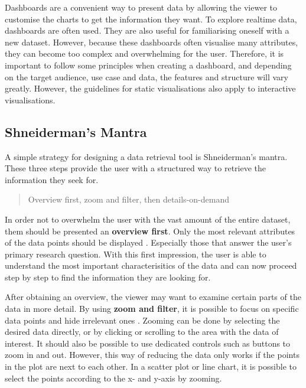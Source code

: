 \documentclass[11pt]{article}
\begin{document}
Dashboards are a convenient way to present data by allowing the viewer to customise the charts to get the information they want. To explore realtime data, dashboards are often used. They are also useful for familiarising oneself with a new dataset. However, because these dashboards often visualise many attributes, they can become too complex and overwhelming for the user. Therefore, it is important to follow some principles when creating a dashboard, and depending on the target audience, use case and data, the features and structure will vary greatly. However, the guidelines for static visualisations also apply to interactive visualisations.

\subsection{Shneiderman's Mantra}

A simple strategy for designing a data retrieval tool is Shneiderman's mantra. These three steps provide the user with a structured way to retrieve the information they seek for.

\begin{quote}
    Overview first, zoom and filter, then details-on-demand \parencite{shneiderman_thousand-fold_1997}
\end{quote}

In order not to overwhelm the user with the vast amount of the entire dataset, them should be presented an \textbf{overview first}. Only the most relevant attributes of the data points should be displayed \parencite{shneiderman_eyes_1996}. Especially those that answer the user's primary research question. With this first impression, the user is able to understand the most important characterisitics of the data and can now proceed step by step to find the information they are looking for.

After obtaining an overview, the viewer may want to examine certain parts of the data in more detail. By using \textbf{zoom and filter}, it is possible to focus on specific data points and hide irrelevant ones \parencite{shneiderman_eyes_1996}. Zooming can be done by selecting the desired data directly, or by clicking or scrolling to the area with the data of interest. It should also be possible to use dedicated controls such as buttons to zoom in and out. However, this way of reducing the data only works if the points in the plot are next to each other. In a scatter plot or line chart, it is possible to select the points according to the x- and y-axis by zooming. 
\end{document}

